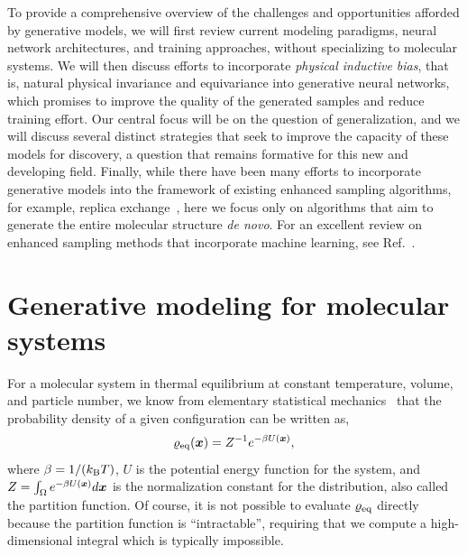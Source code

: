 \documentclass[11pt]{article}
\begin{document}
To provide a comprehensive overview of the challenges and opportunities afforded by generative models, we will first review current modeling paradigms, neural network architectures, and training approaches, without specializing to molecular systems. 
We will then discuss efforts to incorporate \emph{physical inductive bias}, that is, natural physical invariance and equivariance into generative neural networks, which promises to improve the quality of the generated samples and reduce training effort.
Our central focus will be on the question of generalization, and we will discuss several distinct strategies that seek to improve the capacity of these models for discovery, a question that remains formative for this new and developing field.
Finally, while there have been many efforts to incorporate generative models into the framework of existing enhanced sampling algorithms, for example, replica exchange~\cite{invernizzi_skipping_2022, wang_2023}, here we focus only on algorithms that aim to generate the entire molecular structure \emph{de novo}.
For an excellent review on enhanced sampling methods that incorporate machine learning, see Ref.~\cite{mehdi_enhanced_2023}.


\section{Generative modeling for molecular systems}

For a molecular system in thermal equilibrium at constant temperature, volume, and particle number, we know from elementary statistical mechanics~\cite{chandler_introduction_1987} that the probability density of a given configuration can be written as,
\begin{equation}
    \varrho_{\rm eq}(\boldsymbol{x}) = Z^{-1} e^{-\beta U(\boldsymbol{x})},
    \label{eq:rhoeq}
\end{equation}
where $\beta=1/(k_{\rm B} T)$, $U$ is the potential energy function for the system, and $Z = \int_{\Omega} e^{-\beta U(\boldsymbol{x})} d\boldsymbol{x}$ is the normalization constant for the distribution, also called the partition function. 
Of course, it is not possible to evaluate $\varrho_{\rm eq}$ directly because the partition function is ``intractable'', requiring that we compute a high-dimensional integral which is typically impossible.
\end{document}
